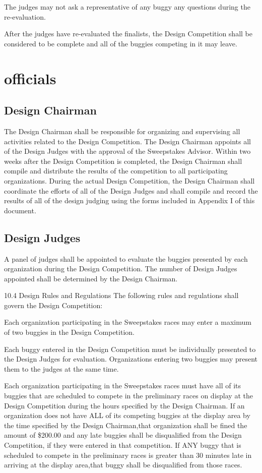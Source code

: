 \documentclass[openany]{book}
\begin{document}
The judges may not ask a representative of any buggy any questions during the re-evaluation.

After the judges have re-evaluated the finalists, the Design Competition shall be considered to be complete and all of the buggies competing in it may leave.

\section{officials}

\subsection{Design Chairman}

The Design Chairman shall be responsible for organizing and supervising all activities related to the Design Competition. The Design Chairman appoints all of the Design Judges with the approval of the Sweepstakes Advisor. Within two weeks after the Design Competition is completed, the Design Chairman shall compile and distribute the results of the competition to all participating organizations. During the actual Design Competition, the Design Chairman shall coordinate the efforts of all of the Design Judges and shall compile and record the results of all of the design judging using the forms included in Appendix I of this document.

\subsection{Design Judges}

A panel of judges shall be appointed to evaluate the buggies presented by each organization during the Design Competition. The number of Design Judges appointed shall be determined by the Design Chairman.

10.4 Design Rules and Regulations
The following rules and regulations shall govern the Design Competition:

Each organization participating in the Sweepstakes races may enter a maximum of two buggies in the Design Competition.

Each buggy entered in the Design Competition must be individually presented to the Design Judges for evaluation. Organizations entering two buggies may present them to the judges at the same time.

Each organization participating in the Sweepstakes races must have all of its buggies that are scheduled to compete in the preliminary races on display at the Design Competition during the hours specified by the Design Chairman. If an organization does not have ALL of its competing buggies at the display area by the time specified by the Design Chairman,that organization shall be fined the amount of \$200.00 and any late buggies shall be disqualified from the Design Competition, if they were entered in that competition. If ANY buggy that is scheduled to compete in the preliminary races is greater than 30 minutes late in arriving at the display area,that buggy shall be disqualified from those races.
\end{document}
